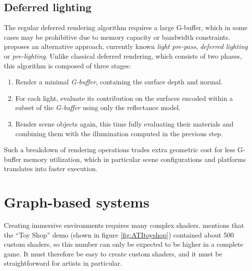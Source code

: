\subsection{Deferred lighting}
\label{sec:DeferredLighting}

The regular deferred rendering algorithm requires a large G-buffer, which in some cases may be prohibitive due to memory capacity or bandwidth constraints. \citet{Engel08PrePass} proposes an alternative approach, currently known \emph{light pre-pass}, \emph{deferred lighting} or \emph{pre-lighting}. Unlike classical deferred rendering, which consists of two phases, this algorithm is composed of three stages:

\begin{enumerate}
\item Render a minimal \emph{G-buffer}, containing the surface depth and normal.
\item For each light, evaluate its contribution on the surfaces encoded within a subset of the \emph{G-buffer} using only the reflectance model.
\item Render scene objects again, this time fully evaluating their materials and combining them with the illumination computed in the previous step.
\end{enumerate}

Such a breakdown of rendering operations trades extra geometric cost for less G-buffer memory utilization, which in particular scene configurations and platforms translates into faster execution.


\section{Graph-based systems}

Creating immersive environments requires many complex shaders. \citet{Tatarchuk06ToyShop} mentions that the ``Toy Shop'' demo (shown in figure \ref{fig:ATItoyshop}) contained about 500 custom shaders, so this number can only be expected to be higher in a complete game. It must therefore be easy to create custom shaders, and it must be straightforward for artists in particular.

